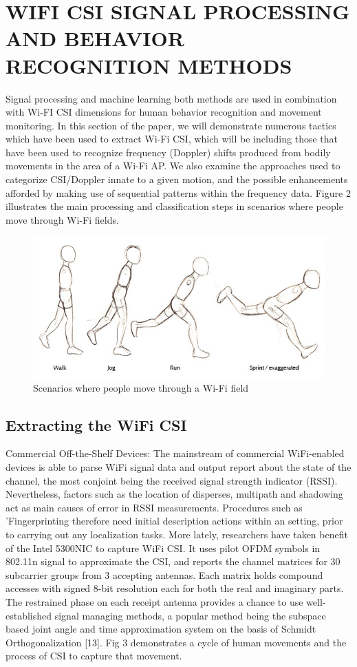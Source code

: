 \documentclass[conference]{IEEEtran}
\begin{document}
\section{WIFI CSI SIGNAL PROCESSING AND BEHAVIOR RECOGNITION METHODS}
Signal processing and machine learning both methods are used in combination with Wi-FI CSI dimensions for human behavior recognition and movement monitoring. In this section of the paper, we will demonstrate numerous tactics which have been used to extract Wi-Fi CSI, which will be including those that have been used to recognize frequency (Doppler) shifts produced from bodily movements in the area of a Wi-Fi AP. We also examine the approaches used to categorize CSI/Doppler innate to a given motion, and the possible enhancements afforded by making use of sequential patterns within the frequency data. Figure 2 illustrates the main processing and classification steps in scenarios where people move through Wi-Fi fields.

\begin{figure}[h!]
    \includegraphics[scale=0.35]{fig12.png}
    \caption{Scenarios where people move through a Wi-Fi field}
    \label{fig:me}
\end{figure}

\subsection{ Extracting the WiFi CSI }
Commercial Off-the-Shelf Devices: The mainstream of commercial WiFi-enabled devices is able to parse WiFi signal data and output report about the state of the channel, the most conjoint being the received signal strength indicator (RSSI). Nevertheless, factors such as the location of disperses, multipath and shadowing act as main causes of error in RSSI measurements. Procedures such as ’Fingerprinting therefore need initial description actions within an setting, prior to carrying out any localization tasks. More lately, researchers have taken benefit of the Intel 5300NIC to capture WiFi CSI. It uses pilot OFDM symbols in 802.11n signal to approximate the CSI, and reports the channel matrices for 30 subcarrier groups from 3 accepting antennas. Each matrix holds compound accesses with signed 8-bit resolution each for both the real and imaginary parts. The restrained phase on each receipt antenna provides a chance to use well-established signal managing methods, a popular method being the subspace based joint angle and time approximation system on the basis of Schmidt Orthogonalization [13]. Fig 3 demonstrates a cycle of human movements and the process of CSI to capture that movement.
\newline
\end{document}
